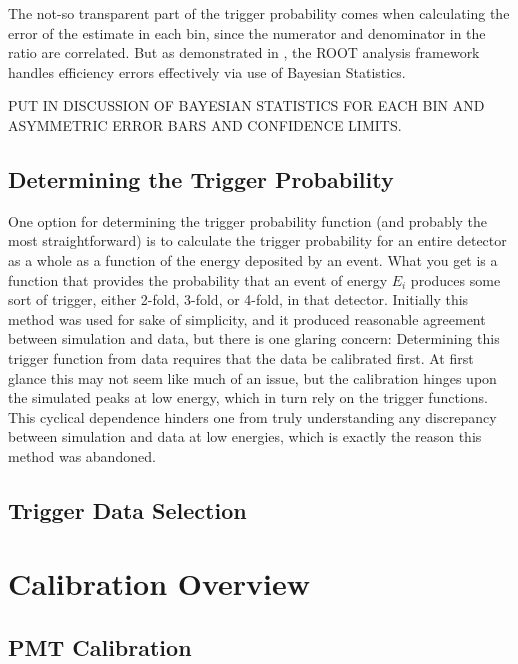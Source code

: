 The not-so transparent part of the trigger probability comes when calculating the error of the estimate in 
each bin, since the numerator and denominator in the ratio are correlated. But as demonstrated in \cite{casadei2009efficiency}, the ROOT analysis framework handles efficiency errors effectively via use of Bayesian Statistics. 

PUT IN DISCUSSION OF BAYESIAN STATISTICS FOR EACH BIN AND ASYMMETRIC ERROR BARS
AND CONFIDENCE LIMITS.



\subsection{Determining the Trigger Probability}
One option for determining the trigger probability function (and probably the 
most straightforward) is to calculate the trigger probability for an entire detector as 
a whole as a function of the energy deposited by an event. What you get is a function that
provides the probability that an event of energy $ E_i $ produces some sort of trigger, either
2-fold, 3-fold, or 4-fold, in that detector. Initially this method was used for sake of 
simplicity, and it produced reasonable agreement between simulation and data, but there is one 
glaring concern: Determining this trigger function from data requires that the data be calibrated 
first. At first glance this may not seem like much of an issue, but the calibration hinges upon the 
simulated peaks at low energy, which in turn rely on the trigger functions. This cyclical dependence
hinders one from truly understanding any discrepancy between simulation and data at low energies, which 
is exactly the reason this method was abandoned.  

\subsection{Trigger Data Selection}




\section{Calibration Overview}

\subsection{PMT Calibration}

